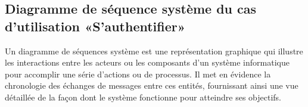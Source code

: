 





\newpage
\subsection{Diagramme de séquence système du cas d’utilisation «S’authentifier»}
Un diagramme de séquences système est une représentation graphique qui illustre les interactions entre les acteurs ou les composants d'un système informatique pour accomplir une série d'actions ou de processus. Il met en évidence la chronologie des échanges de messages entre ces entités, fournissant ainsi une vue détaillée de la façon dont le système fonctionne pour atteindre ses objectifs.


